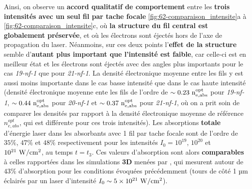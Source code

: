 \begin{refsection}
Ainsi, on observe un \textbf{accord qualitatif de comportement} entre les \textbf{trois intensités avec un seul fil par tache focale} \ref{fig:62-comparaison_intensite}a à \ref{fig:62-comparaison_intensite}c, où \textbf{la structure du fil central est globalement préservée}, et où les électrons sont éjectés hors de l'axe de propagation du laser. Néanmoins, sur ces deux points l'\textbf{effet de la structure} semble d'\textbf{autant plus important que l'intensité est faible}, car celle-ci est en meilleur état et les électrons sont éjectés avec des angles plus importants pour le cas \textit{19-nf-1} que pour \textit{21-nf-1}. La densité électronique moyenne entre les fils y est aussi moins importante dans le cas basse intensité que dans le cas haute intensité (densité électronique moyenne ente les fils de l'ordre de $\sim 0.23 ~ \rm n_{e,abs}^{opt}$ pour \textit{19-nf-1}, $\sim 0.44 ~ \rm n_{e,abs}^{opt}$ pour \textit{20-nf-1} et  $\sim 0.37 ~ \rm n_{e,abs}^{opt}$ pour \textit{21-nf-1}, où on a prit soin de comparer les densités par rapport à la densité électronique moyenne de référence $n_{e,abs}^{opt}$, qui est différente pour ces trois intensités). Les absorptions \textbf{totale} d'énergie laser dans les absorbants avec 1 fil par tache focale sont de l'ordre de $35\%$, $47\%$ et $48\%$ respectivement pour les intensités $I_0=10^{19}$, $10^{20}$ et $10^{21} ~ \rm W/cm^2$, au temps $t=t_3$. Ces valeurs d'absorption sont alors \textbf{comparables} à celles rapportées dans les simulations \textbf{3D} menées par \cite{jiang_2014}, qui mesurent autour de $43\%$ d'absorption pour les conditions évoquées précédemment (tours de côté 1 µm éclairés par un laser d'intensité $I_0 \sim 5 \times 10^{21} ~ \rm W/cm^2$).


\end{refsection}
